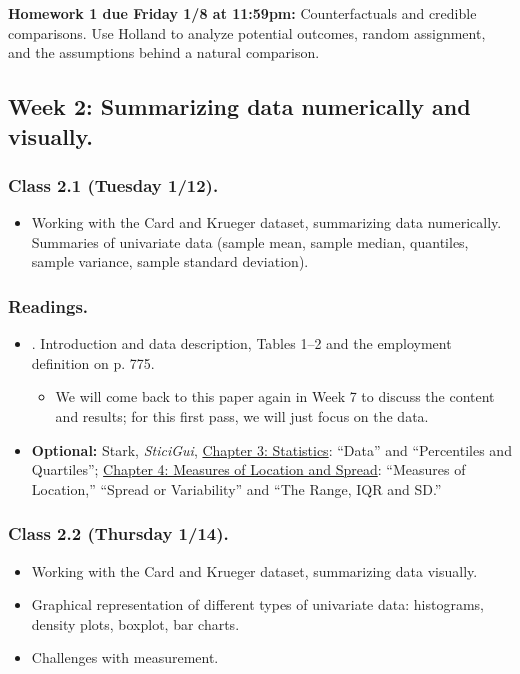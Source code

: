\documentclass[letterpaper, 12pt, parskip=full,DIV=10]{scrartcl}
\begin{document}
\textbf{Homework 1 due Friday 1/8 at 11:59pm:}
Counterfactuals and credible comparisons. Use Holland to analyze potential outcomes, random assignment, and the assumptions behind a natural comparison.

\subsection*{Week 2: Summarizing data numerically and visually.}
\subsubsection*{Class 2.1 (Tuesday 1/12).}
\begin{itemize}
\item Working with the Card and Krueger dataset, summarizing data numerically.
Summaries of univariate data (sample mean, sample median, quantiles, sample variance, sample standard deviation).
\end{itemize}

\subsubsection*{Readings.}
\begin{itemize}
\item {}. Introduction and data description, Tables 1--2 and the employment definition on p. 775.\begin{itemize}
\item We will come back to this paper again in Week 7 to discuss the content and results; for this first pass, we will just focus on the data.
\end{itemize}
\item \textbf{Optional:} Stark, \textit{SticiGui}, \href{https://www.stat.berkeley.edu/~stark/SticiGui/Text/histograms.htm}{Chapter 3: Statistics}: ``Data'' and ``Percentiles and Quartiles''; \href{https://www.stat.berkeley.edu/~stark/SticiGui/Text/location.htm}{Chapter 4: Measures of Location and Spread}: ``Measures of Location,'' ``Spread or Variability'' and ``The Range, IQR and SD.''
\end{itemize}

\subsubsection*{Class 2.2 (Thursday 1/14).}
\begin{itemize}
\item Working with the Card and Krueger dataset, summarizing data visually.
\item Graphical representation of different types of univariate data: histograms, density plots, boxplot, bar charts.
\item Challenges with measurement.
\end{itemize}
\end{document}
